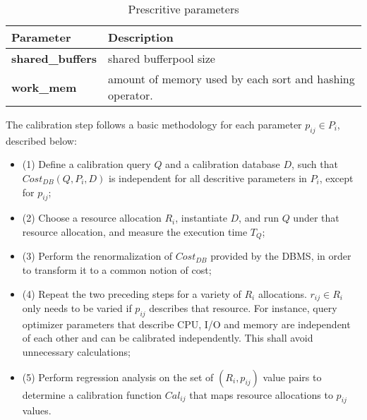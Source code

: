 \begin{table}[ht]
    \centering
    \begin{tabular}{ | l | p{5cm} |}
    \hline
      Parameter & Description  \\ \hline
    \textbf{shared\_buffers} & shared bufferpool size \\ \hline
    \textbf{work\_mem} & amount of memory used by each sort and hashing operator. \\
    \hline
    \end{tabular}
    \caption{Prescritive parameters}
    \label{table:prescritive}
\end{table}

The calibration step follows a basic methodology for each parameter $p_{ij} \in P_{i}$, described below:

\begin{itemize}
 \item (1) Define a calibration query $Q$ and a calibration database $D$, such that $Cost_{DB}(Q,P_{i},D)$ is independent for all descritive parameters in $P_{i}$, except for $p_{ij}$; \\
  \item (2) Choose a resource allocation $R_{i}$, instantiate $D$, and run $Q$ under that resource allocation, and measure the execution time $T_{Q}$; \\
  \item (3) Perform the renormalization of $Cost_{DB}$ provided by the DBMS, in order to transform it to a common notion of cost; \\
  \item (4) Repeat the two preceding steps for a variety of $R_{i}$ allocations. $r_{ij} \in R_{i}$ only needs to be varied if $p_{ij}$ describes that resource. For instance, query optimizer parameters that describe CPU, I/O and memory are independent of each other and can be calibrated independently. This shall avoid unnecessary calculations; \\
  \item (5) Perform regression analysis on the set of $(R_{i},p_{ij})$ value pairs to determine a calibration function $Cal_{ij}$ that maps resource allocations to $p_{ij}$ values. \\
\end{itemize}

